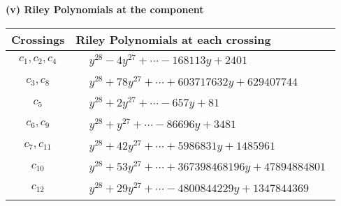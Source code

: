 \documentclass[1p]{elsarticle_modified}
\theoremstyle{definition}
\begin{document}
\flushleft \textbf{(v) Riley Polynomials at the component}\newline \\
\begin{tabular}{m{50pt}|m{274pt}}
Crossings & \hspace{64pt}Riley Polynomials at each crossing \\
\hline $$\begin{aligned}c_{1},c_{2},c_{4}\end{aligned}$$&$\begin{aligned}
&y^{28}-4 y^{27}+\cdots-168113 y+2401
\end{aligned}$\\
\hline $$\begin{aligned}c_{3},c_{8}\end{aligned}$$&$\begin{aligned}
&y^{28}+78 y^{27}+\cdots+603717632 y+629407744
\end{aligned}$\\
\hline $$\begin{aligned}c_{5}\end{aligned}$$&$\begin{aligned}
&y^{28}+2 y^{27}+\cdots-657 y+81
\end{aligned}$\\
\hline $$\begin{aligned}c_{6},c_{9}\end{aligned}$$&$\begin{aligned}
&y^{28}+y^{27}+\cdots-86696 y+3481
\end{aligned}$\\
\hline $$\begin{aligned}c_{7},c_{11}\end{aligned}$$&$\begin{aligned}
&y^{28}+42 y^{27}+\cdots+5986831 y+1485961
\end{aligned}$\\
\hline $$\begin{aligned}c_{10}\end{aligned}$$&$\begin{aligned}
&y^{28}+53 y^{27}+\cdots+367398468196 y+47894884801
\end{aligned}$\\
\hline $$\begin{aligned}c_{12}\end{aligned}$$&$\begin{aligned}
&y^{28}+29 y^{27}+\cdots-4800844229 y+1347844369
\end{aligned}$\\
\hline
\end{tabular}\\~\\
\end{document}
